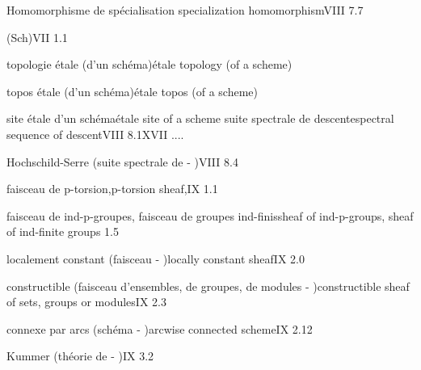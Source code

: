 Homomorphisme de spécialisation\quad {} specialization homomorphism\quad VIII 7.7


(Sch)\qquad VII 1.1

\margin{\unsure{-}}
topologie étale (d'un schéma)\quad étale topology (of a\unsure{)} scheme)

topos étale (d'un schéma)\quad étale topos (of a scheme)

site étale d'un schéma\quad étale site of a scheme
suite spectrale de descente\quad spectral sequence of descent\quad VIII 8.1\quad XVII ....
\margin{\handwritten{*}}

Hochschild-Serre (suite spectrale de - )\quad VIII 8.4

\quad {}

faisceau de p-torsion,\quad p-torsion sheaf,\quad IX 1.1


faisceau de ind-p-groupes, faisceau de groupes ind-finis\quad sheaf of ind-p-groups, sheaf of ind-finite groups\quad {} 1.5

localement constant (faisceau - )\quad locally constant sheaf\quad IX 2.0

constructible (faisceau d'ensembles, de groupes, de modules - )\quad constructible \deleted{\unsure{(}} sheaf of sets, groups or modules\deleted{)}\quad IX 2.3

connexe par arcs (schéma - )\quad arcwise connected scheme\quad IX 2.12

Kummer (théorie de - )\quad IX 3.2


